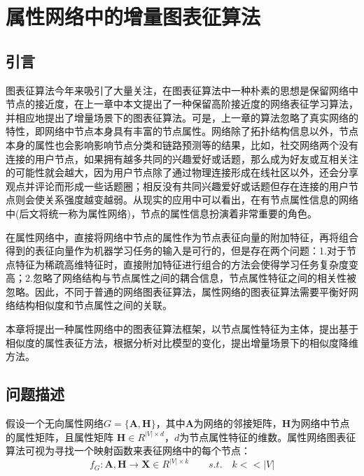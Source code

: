 \chapter{属性网络中的增量图表征算法}
\section{引言}
图表征算法今年来吸引了大量关注，在图表征算法中一种朴素的思想是保留网络中节点的接近度，在上一章中本文提出了一种保留高阶接近度的网络表征学习算法，并相应地提出了增量场景下的图表征算法。可是，上一章的算法忽略了真实网络的特性，即网络中节点本身具有丰富的节点属性。网络除了拓扑结构信息以外，节点本身的属性也会影响影响节点分类和链路预测等的结果，比如，社交网络两个没有连接的用户节点，如果拥有越多共同的兴趣爱好或话题，那么成为好友或互相关注的可能性就会越大，因为用户节点除了通过物理连接形成在线社区以外，还会分享观点并评论而形成一些话题圈；相反没有共同兴趣爱好或话题但存在连接的用户节点则会使关系强度越变越弱。从现实的应用中可以看出，在有节点属性信息的网络中(后文将统一称为属性网络)，节点的属性信息扮演着非常重要的角色。

在属性网络中，直接将网络中节点的属性作为节点表征向量的附加特征，再将组合得到的表征向量作为机器学习任务的输入是可行的，但是存在两个问题：1.对于节点特征为稀疏高维特征时，直接附加特征进行组合的方法会使得学习任务复杂度变高；2.忽略了网络结构与节点属性之间的耦合信息，节点属性特征之间的相关性被忽略。因此，不同于普通的网络图表征算法，属性网络的图表征算法需要平衡好网络结构相似度和节点属性之间的关联\cite{huang2017label}。

本章将提出一种属性网络中的图表征算法框架，以节点属性特征为主体，提出基于相似度的属性表征方法，根据分析对比模型的变化，提出增量场景下的相似度降维方法。

\section{问题描述}
假设一个无向属性网络$G=\{\textbf{A}, \textbf{H}\}$，其中\textbf{A}为网络的邻接矩阵，\textbf{H}为网络中节点的属性矩阵，且属性矩阵 $\textbf{H}\in R^{|V|\times d}$，$d$为节点属性特征的维数。属性网络图表征算法可视为寻找一个映射函数来表征网络中的每个节点：
\begin{equation}
f_G: \textbf{A}, \textbf{H} \rightarrow \textbf{X} \in R^{|V| \times k} \qquad s.t.\quad k<<|V|
\end{equation}


